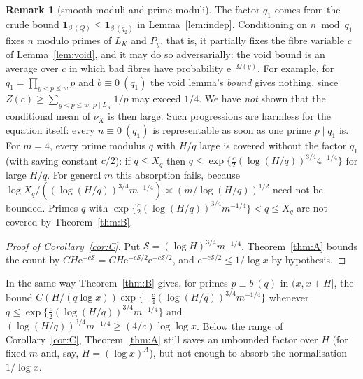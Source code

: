 \documentclass[10pt,reqno]{amsart}
\theoremstyle{definition}
\newtheorem{remark}[theorem]{Remark}
\newcommand{\ind}{\mathbf 1}
\newcommand{\e}{\mathrm e}
\begin{document}
\begin{remark}[smooth moduli and prime moduli]\label{rem:smoothq}
The factor $q_1$ comes from the crude bound
$\ind_{\beta\ (Q)}\leq\ind_{\beta\ (q_2)}$ in Lemma~\ref{lem:indep}.
Conditioning on $n\bmod q_1$ fixes $n$ modulo primes of $L_K$ and $P_y$,
that is, it partially fixes the fibre variable $c$ of
Lemma~\ref{lem:void}, and it may do so adversarially: the void bound is
an average over $c$ in which bad fibres have probability
$\e^{-\Omega(y)}$.  For example, for $q_1=\prod_{y<p\leq w}p$ and
$b\equiv0\ (q_1)$ the void lemma's \emph{bound} gives nothing, since
$Z(c)\geq\sum_{y<p\leq w,\,p\mid L_K}1/p$ may exceed $1/4$.  We have
\emph{not} shown that the conditional mean of $\nu_X$ is then large.
Such progressions are harmless for the equation itself: every
$n\equiv0\ (q_1)$ is representable as soon as one prime $p\mid q_1$ is.
For $m=4$, every prime modulus $q$ with $H/q$ large is covered without
the factor $q_1$ (with saving constant $c/2$): if $q\leq X_q$ then $q\leq\exp\{\frac c2(\log(H/q))^{3/4}4^{-1/4}\}$
for large $H/q$.  For general $m$ this absorption fails, because
$\log X_q/((\log(H/q))^{3/4}m^{-1/4})\asymp(m/\log(H/q))^{1/2}$ need not be
bounded.  Primes $q$ with
$\exp\{\frac c2(\log(H/q))^{3/4}m^{-1/4}\}<q\leq X_q$ are not covered by
Theorem~\ref{thm:B}.
\end{remark}

\begin{proof}[Proof of Corollary~\ref{cor:C}]
Put $\mathcal S=(\log H)^{3/4}m^{-1/4}$.  Theorem~\ref{thm:A} bounds the
count by $CH\e^{-c\mathcal S}=CH\e^{-c\mathcal S/2}\e^{-c\mathcal S/2}$, and
$\e^{-c\mathcal S/2}\leq1/\log x$ by hypothesis.
\end{proof}

In the same way Theorem~\ref{thm:B} gives, for primes $p\equiv b\ (q)$
in $(x,x+H]$, the bound
$C(H/(q\log x))\exp\{-\frac c4(\log(H/q))^{3/4}m^{-1/4}\}$ whenever
$q\leq\exp\{\frac c2(\log(H/q))^{3/4}m^{-1/4}\}$ and
$(\log(H/q))^{3/4}m^{-1/4}\geq(4/c)\log\log x$.  Below the range of
Corollary~\ref{cor:C}, Theorem~\ref{thm:A} still saves an unbounded
factor over $H$ (for fixed $m$ and, say, $H=(\log x)^A$), but not enough to
absorb the normalisation $1/\log x$.
\end{document}
